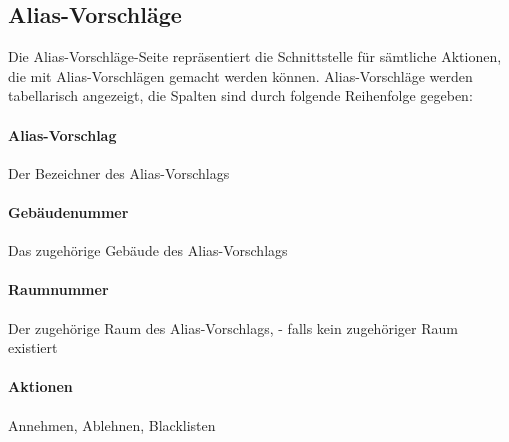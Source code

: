 \subsection{Alias-Vorschläge}

Die Alias-Vorschläge-Seite repräsentiert die Schnittstelle für sämtliche Aktionen, die mit Alias-Vorschlägen gemacht werden können.
Alias-Vorschläge werden tabellarisch angezeigt, die Spalten sind durch folgende Reihenfolge gegeben:

\paragraph*{Alias-Vorschlag} 
    Der Bezeichner des Alias-Vorschlags
\paragraph*{Gebäudenummer} 
    Das zugehörige Gebäude des Alias-Vorschlags
\paragraph*{Raumnummer} 
    Der zugehörige Raum des Alias-Vorschlags, \dq - \dq{} falls kein zugehöriger Raum existiert
\paragraph*{Aktionen} 
    Annehmen, Ablehnen, Blacklisten
